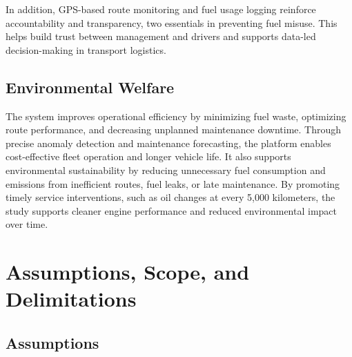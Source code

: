 In addition, GPS-based route monitoring and fuel usage logging reinforce accountability and transparency, two essentials in preventing fuel misuse. This helps build trust between management and drivers and supports data-led decision-making in transport logistics.


\subsection{Environmental Welfare}

The system improves operational efficiency by minimizing fuel waste, optimizing route performance, and decreasing unplanned maintenance downtime. Through precise anomaly detection and maintenance forecasting, the platform enables cost-effective fleet operation and longer vehicle life. It also supports environmental sustainability by reducing unnecessary fuel consumption and emissions from inefficient routes, fuel leaks, or late maintenance. By promoting timely service interventions, such as oil changes at every 5,000 kilometers, the study supports cleaner engine performance and reduced environmental impact over time.


\section{Assumptions, Scope, and Delimitations}


\subsection{Assumptions}

